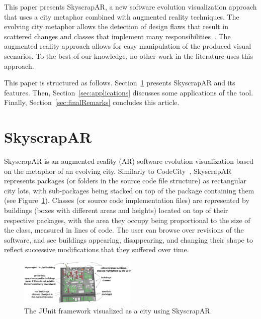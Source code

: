 This paper presents SkyscrapAR, a new software evolution visualization approach that uses a city metaphor combined with augmented reality techniques. The evolving city metaphor allows the detection of design flaws that result in scattered changes and classes that implement many responsibilities~\cite{silva:2012}. The augmented reality approach allows for easy manipulation of the produced visual scenarios. To the best of our knowledge, no other work in the literature uses this approach.

This paper is structured as follows. Section~\ref{sec:skyscrapar} presents SkyscrapAR and its features. Then, Section~\ref{sec:applications} discusses some applications of the tool. Finally, Section~\ref{sec:finalRemarks} concludes this article.

\section{SkyscrapAR} \label{sec:skyscrapar}
SkyscrapAR is an augmented reality (AR) software evolution visualization based on the metaphor of an evolving city. Similarly to CodeCity~\cite{wettel:2008}, SkyscrapAR represents packages (or folders in the source code file structure) as rectangular city lots, with sub-packages being stacked on top of the package containing them (see Figure~\ref{fig:sample_junit}). Classes (or source code implementation files) are represented by buildings (boxes with different areas and heights) located on top of their respective packages, with the area they occupy being proportional to the size of the class, measured in lines of code. The user can browse over revisions of the software, and see buildings appearing, disappearing, and changing their shape to reflect successive modifications that they suffered over time.

\begin{figure}[ht!]
 \centering
 \includegraphics[width=0.5\textwidth, bb=0 0 1214 477]{./images/infographic}
 \caption{The JUnit framework visualized as a city using SkyscrapAR.}
 \label{fig:sample_junit}
\end{figure}

